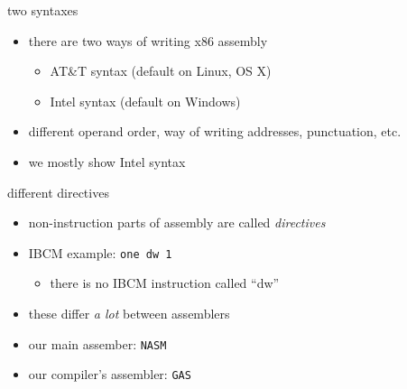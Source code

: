 \begin{frame}{two syntaxes}
\begin{itemize}
\item there are two ways of writing x86 assembly
\begin{itemize}
\item AT\&T syntax (default on Linux, OS X)
\item Intel syntax (default on Windows)
\end{itemize}
\item different operand order, way of writing addresses, punctuation, etc.
\item we mostly show Intel syntax
\end{itemize}
\end{frame}

\begin{frame}{different directives}
\begin{itemize}
\item non-instruction parts of assembly are called \textit{directives}
\item IBCM example: \texttt{one   dw  1}
\begin{itemize}\item there is no IBCM instruction called ``dw''\end{itemize}
\item these differ \textit{a lot} between assemblers
\item our main assember: \texttt{NASM} 
\item our compiler's assembler: \texttt{GAS}
\end{itemize}
\end{frame}
